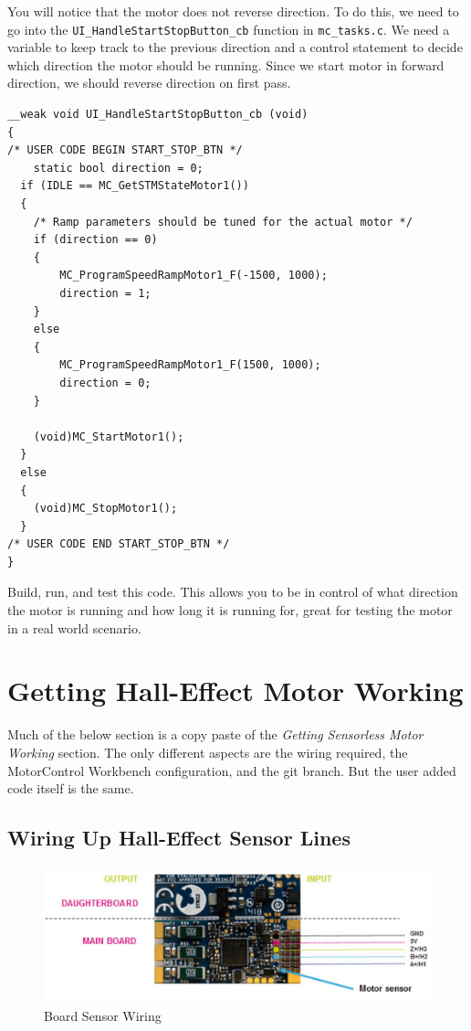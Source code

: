 \documentclass[10pt]{article}
\begin{document}
                You will notice that the motor does not reverse direction. To do this, we need to go into the \texttt{UI\_HandleStartStopButton\_cb} function in \texttt{mc\_tasks.c}. We need a variable to keep track to the previous direction and a control statement to decide which direction the motor should be running. Since we start motor in forward direction, we should reverse direction on first pass.
                \begin{verbatim}
__weak void UI_HandleStartStopButton_cb (void)
{
/* USER CODE BEGIN START_STOP_BTN */
    static bool direction = 0;
  if (IDLE == MC_GetSTMStateMotor1())
  {
    /* Ramp parameters should be tuned for the actual motor */
    if (direction == 0)
    {
        MC_ProgramSpeedRampMotor1_F(-1500, 1000);
        direction = 1;
    }
    else
    {
        MC_ProgramSpeedRampMotor1_F(1500, 1000);
        direction = 0;
    }

    (void)MC_StartMotor1();
  }
  else
  {
    (void)MC_StopMotor1();
  }
/* USER CODE END START_STOP_BTN */
}
                \end{verbatim}
                Build, run, and test this code. This allows you to be in control of what direction the motor is running and how long it is running for, great for testing the motor in a real world scenario.
	\FloatBarrier \section{Getting Hall-Effect Motor Working}
        Much of the below section is a copy paste of the \emph{Getting Sensorless Motor Working} section. The only different aspects are the wiring required, the MotorControl Workbench configuration, and the git branch. But the user added code itself is the same. 
		\FloatBarrier \subsection{Wiring Up Hall-Effect Sensor Lines}
            \begin{figure}[H]
                \centerline{\includegraphics[width=\textwidth]{References/Sensor Wiring.png}}
                \caption{Board Sensor Wiring}
            \end{figure}
\end{document}
